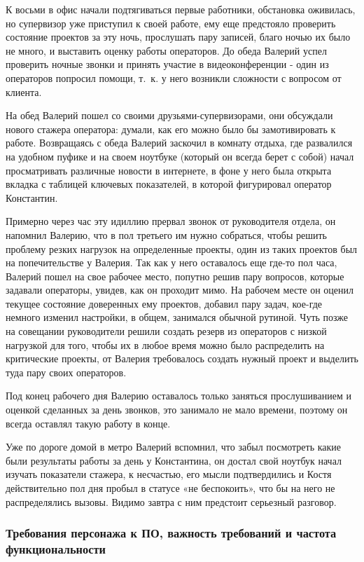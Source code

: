 К восьми в офис начали подтягиваться первые работники, обстановка оживилась,
но супервизор уже приступил к своей работе,
ему еще предстояло проверить состояние проектов за эту ночь,
прослушать пару записей, благо ночью их было не много,
и выставить оценку работы операторов.
До обеда Валерий успел проверить ночные звонки и принять участие в
видеоконференции - один из операторов попросил помощи,
т.~к. у него возникли сложности с вопросом от клиента.

На обед Валерий пошел со своими друзьями-супервизорами, они обсуждали нового стажера оператора: думали, как его можно было бы замотивировать к работе. Возвращаясь с обеда Валерий заскочил в комнату отдыха, где развалился на удобном пуфике и на своем ноутбуке (который он всегда берет с собой) начал просматривать различные новости в интернете, в фоне у него была открыта вкладка с таблицей ключевых показателей, в которой фигурировал оператор Константин.

Примерно через час эту идиллию прервал звонок от руководителя отдела, он напомнил Валерию, что в пол третьего им нужно собраться, чтобы решить проблему резких нагрузок на определенные проекты, один из таких проектов был на попечительстве у Валерия. Так как у него оставалось еще где-то пол часа, Валерий пошел на свое рабочее место, попутно решив пару вопросов, которые задавали операторы, увидев, как он проходит мимо. На рабочем месте он оценил текущее состояние доверенных ему проектов, добавил пару задач, кое-где немного изменил настройки, в общем, занимался обычной рутиной. Чуть позже на совещании руководители решили создать резерв из операторов с низкой нагрузкой для того, чтобы их в любое время можно было распределить на критические проекты, от Валерия требовалось создать нужный проект и выделить туда пару своих операторов.

Под конец рабочего дня Валерию оставалось только заняться прослушиванием и оценкой сделанных за день звонков, это занимало не мало времени, поэтому он всегда оставлял такую работу в конце.

Уже по дороге домой в метро Валерий вспомнил, что забыл посмотреть какие были результаты работы за день у Константина, он достал свой ноутбук начал изучать показатели стажера, к несчастью, его мысли подтвердились и Костя действительно пол дня пробыл в статусе «не беспокоить», что бы на него не распределялись вызовы. Видимо завтра с ним предстоит серьезный разговор.

\subsubsection{Требования персонажа к ПО, важность требований и частота функциональности}

